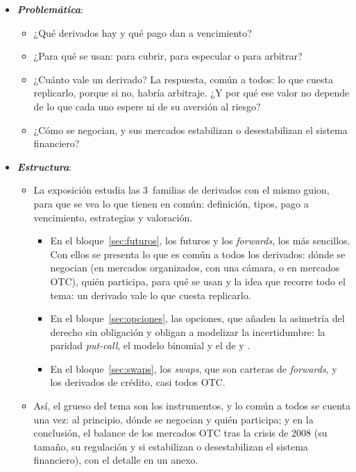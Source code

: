 \documentclass[11pt]{article}
\begin{document}
\begin{itemize}
\item \textbf{\emph{Problemática}}:
  \begin{itemize}
  \item ¿Qué derivados hay y qué pago dan a vencimiento?
  \item ¿Para qué se usan: para cubrir, para especular o para arbitrar?
  \item ¿Cuánto vale un derivado? La respuesta, común a todos: lo que cuesta replicarlo, porque si no, habría arbitraje. ¿Y por qué ese valor no depende de lo que cada uno espere ni de su aversión al riesgo?
  \item ¿Cómo se negocian, y sus mercados estabilizan o desestabilizan el sistema financiero?
  \end{itemize}

\item \textbf{\emph{Estructura}}:
  \begin{itemize}
  \item La exposición estudia las 3~familias de derivados con el mismo guion, para que se vea lo que tienen en común: definición, tipos, pago a vencimiento, estrategias y valoración.
  \begin{itemize}
  \item En el bloque~\ref{sec:futuros}, los futuros y los \emph{forwards}, los más sencillos. Con ellos se presenta lo que es común a todos los derivados: dónde se negocian (en mercados organizados, con una cámara, o en mercados OTC), quién participa, para qué se usan y la idea que recorre todo el tema: un derivado vale lo que cuesta replicarlo.
  \item En el bloque~\ref{sec:opciones}, las opciones, que añaden la asimetría del derecho sin obligación y obligan a modelizar la incertidumbre: la paridad \emph{put-call}, el modelo binomial y el de  y .
  \item En el bloque~\ref{sec:swaps}, los \emph{swaps}, que son carteras de \emph{forwards}, y los derivados de crédito, casi todos OTC.
  \end{itemize}
  \item Así, el grueso del tema son los instrumentos, y lo común a todos se cuenta una vez: al principio, dónde se negocian y quién participa; y en la conclusión, el balance de los mercados OTC tras la crisis de 2008 (su tamaño, su regulación y si estabilizan o desestabilizan el sistema financiero), con el detalle en un anexo.
  \end{itemize}
\end{itemize}
\end{document}
